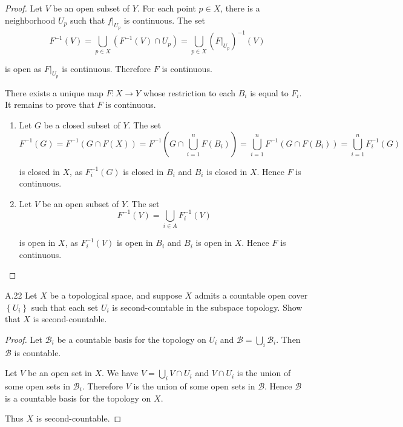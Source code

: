 \begin{proof}
    Let \( V \) be an open subset of \( Y \). For each point \( p \in X \), there is a neighborhood \( U_{p} \) such that \( f\vert_{U_{p}} \) is continuous. The set
    \[
        F^{-1}(V) = \bigcup_{p\in X} (F^{-1}(V) \cap U_{p}) = \bigcup_{p\in X} {(F\vert_{U_{p}})}^{-1}(V)
    \]

    is open as \( F\vert_{U_{p}} \) is continuous. Therefore \( F \) is continuous.

    \hrulefill%

    There exists a unique map \( F: X \to Y \) whose restriction to each \( B_{i} \) is equal to \( F_{i} \). It remains to prove that \( F \) is continuous.

    \begin{enumerate}[itemsep=0pt,label={(\alph*)}]
        \item Let \( G \) be a closed subset of \( Y \). The set
              \[
                  F^{-1}(G) = F^{-1}(G \cap F(X)) = F^{-1}\left( G \cap \bigcup_{i=1}^{n} F(B_{i}) \right) = \bigcup_{i=1}^{n} F^{-1}(G \cap F(B_{i})) = \bigcup_{i=1}^{n} F_{i}^{-1}(G)
              \]

              is closed in \( X \), as \( F_{i}^{-1}(G) \) is closed in \( B_{i} \) and \( B_{i} \) is closed in \( X \). Hence \( F \) is continuous.
        \item Let \( V \) be an open subset of \( Y \). The set
              \[
                  F^{-1}(V) = \bigcup_{i \in A} F_{i}^{-1}(V)
              \]

              is open in \( X \), as \( F_{i}^{-1}(V) \) is open in \( B_{i} \) and \( B_{i} \) is open in \( X \). Hence \( F \) is continuous.
    \end{enumerate}
\end{proof}

\begin{exercise}{A.22}
    Let \( X \) be a topological space, and suppose \( X \) admits a countable open cover \( \left\{ U_{i} \right\} \) such that each set \( U_{i} \) is second-countable in the subspace topology. Show that \( X \) is second-countable.
\end{exercise}

\begin{proof}
    Let \( \mathcal{B}_{i} \) be a countable basis for the topology on \( U_{i} \) and \( \mathcal{B} = \bigcup_{i} \mathcal{B}_{i} \). Then \( \mathcal{B} \) is countable.

    Let \( V \) be an open set in \( X \). We have \( V = \bigcup_{i} V \cap U_{i} \) and \( V \cap U_{i} \) is the union of some open sets in \( \mathcal{B}_{i} \). Therefore \( V \) is the union of some open sets in \( \mathcal{B} \). Hence \( \mathcal{B} \) is a countable basis for the topology on \( X \).

    Thus \( X \) is second-countable.
\end{proof}

